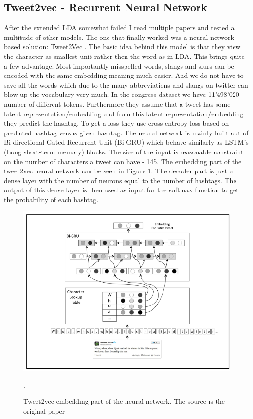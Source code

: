 \documentclass[10pt,conference,compsocconf]{IEEEtran}
\begin{document}
\subsection{Tweet2vec - Recurrent Neural Network}
After the extended LDA somewhat failed I read multiple papers and tested a multitude of other models. The one that finally worked was a neural network based solution: Tweet2Vec \cite{DhingraZFMC16}. The basic idea behind this model is that they view the character as smallest unit rather then the word as in LDA. This brings quite a few advantage. Most importantly misspelled words, slangs and slurs can be encoded with the same embedding meaning much easier. And we do not have to save all the words which due to the many abbreviations and slangs on twitter can blow up the vocabulary very much. In the congress dataset we have 11'498'020 number of different tokens. Furthermore they assume that a tweet has some latent representation/embedding and from this latent representation/embedding they predict the hashtag. To get a loss they use cross entropy loss based on predicted hashtag versus given hashtag. The neural network is mainly built out of Bi-directional Gated Recurrent Unit (Bi-GRU) which behave similarly as LSTM's (Long short-term memory) blocks. The size of the input is reasonable constraint on the number of characters a tweet can have - 145. The embedding part of the tweet2vec neural network can be seen in Figure \ref{fig:tweet2vecembedding}. The decoder part is just a dense layer with the number of neurons equal to the number of hashtags. The output of this dense layer is then used as input for the softmax function to get the probability of each hashtag. 
\begin{figure}
	\centering
	\includegraphics[width=0.7\linewidth]{images/tweet2vec_embedding}
	\caption{Tweet2vec embedding part of the neural network. The source is the original paper \cite{DhingraZFMC16}}.
	\label{fig:tweet2vecembedding}
\end{figure}
\end{document}
